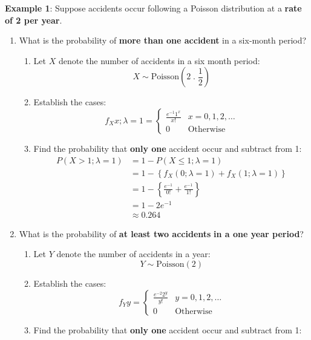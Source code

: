 \documentclass[10pt,a4paper]{article}
\begin{document}
\textbf{Example 1}: Suppose accidents occur following a Poisson distribution at a \textbf{rate of 2
per year}.
\begin{enumerate}
    \item What is the probability of \textbf{more than one accident} in a six-month period?
        \begin{enumerate}
            \item Let $X$ denote the number of accidents in a six month period:
            $$
                X \sim \text{Poisson}\left(2\;.\;\frac{1}{2}\right)
            $$
            \item Establish the cases:
            $$
            f_X{x;\lambda = 1} = 
            \begin{cases}
                \frac{e^{-1}1^x}{x!} & x = 0,1,2,\dots \\
                0 & \text{Otherwise}    
            \end{cases}
            $$
            \item Find the probability that \textbf{only one} accident occur and subtract from 1:
            \begin{align*}
                P(X>1;\lambda = 1) &= 1 - P(X\leq 1; \lambda = 1) \\
                &= 1 - \left\{f_X(0; \lambda = 1)+f_X(1;\lambda = 1)\right\} \\
                &= 1 - \left\{\frac{e^{-1}}{0!}+\frac{e^{-1}}{1!}\right\} \\
                &= 1 -2e^{-1} \\
                &\approx 0.264
            \end{align*}
        \end{enumerate}
    \item What is the probability of \textbf{at least two accidents} \textbf{in a one year period}?
        \begin{enumerate}
            \item Let $Y$ denote the number of accidents in a year:
            $$
                Y \sim \text{Poisson}\left(2\right)
            $$
            \item Establish the cases:
            $$
            f_Y{y} = 
            \begin{cases}
                \frac{e^{-2}2^y}{y!} & y = 0,1,2,\dots \\
                0 & \text{Otherwise}    
            \end{cases}
            $$
            \item Find the probability that \textbf{only one} accident occur and subtract from 1:

\end{enumerate}
\end{enumerate}
\end{document}
